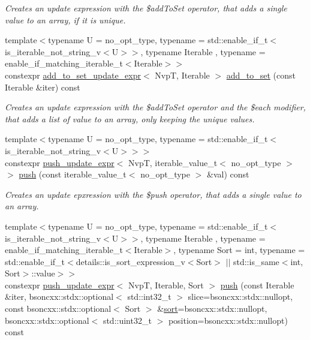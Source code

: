 \begin{DoxyCompactItemize}
\begin{DoxyCompactList}\small\item\em Creates an update expression with the \$add\+To\+Set operator, that adds a single value to an array, if it is unique. \end{DoxyCompactList}\item 
{\footnotesize template$<$typename U  = no\+\_\+opt\+\_\+type, typename  = std\+::enable\+\_\+if\+\_\+t$<$is\+\_\+iterable\+\_\+not\+\_\+string\+\_\+v$<$\+U$>$$>$, typename Iterable , typename  = enable\+\_\+if\+\_\+matching\+\_\+iterable\+\_\+t$<$\+Iterable$>$$>$ }\\constexpr \hyperlink{classmangrove_1_1add__to__set__update__expr}{add\+\_\+to\+\_\+set\+\_\+update\+\_\+expr}$<$ NvpT, Iterable $>$ \hyperlink{classmangrove_1_1nvp__base_ad38a93b45375bb4f5a2a13f2d33672e3}{add\+\_\+to\+\_\+set} (const Iterable \&iter) const 
\begin{DoxyCompactList}\small\item\em Creates an update expression with the \$add\+To\+Set operator and the \$each modifier, that adds a list of value to an array, only keeping the unique values. \end{DoxyCompactList}\item 
{\footnotesize template$<$typename U  = no\+\_\+opt\+\_\+type, typename  = std\+::enable\+\_\+if\+\_\+t$<$is\+\_\+iterable\+\_\+not\+\_\+string\+\_\+v$<$\+U$>$$>$$>$ }\\constexpr \hyperlink{classmangrove_1_1push__update__expr}{push\+\_\+update\+\_\+expr}$<$ NvpT, iterable\+\_\+value\+\_\+t$<$ no\+\_\+opt\+\_\+type $>$ $>$ \hyperlink{classmangrove_1_1nvp__base_ab4db721d19b52e5341c2ba737d2e0de9}{push} (const iterable\+\_\+value\+\_\+t$<$ no\+\_\+opt\+\_\+type $>$ \&val) const 
\begin{DoxyCompactList}\small\item\em Creates an update epxression with the \$push operator, that adds a single value to an array. \end{DoxyCompactList}\item 
{\footnotesize template$<$typename U  = no\+\_\+opt\+\_\+type, typename  = std\+::enable\+\_\+if\+\_\+t$<$is\+\_\+iterable\+\_\+not\+\_\+string\+\_\+v$<$\+U$>$$>$, typename Iterable , typename  = enable\+\_\+if\+\_\+matching\+\_\+iterable\+\_\+t$<$\+Iterable$>$, typename Sort  = int, typename  = std\+::enable\+\_\+if\+\_\+t$<$details\+::is\+\_\+sort\+\_\+expression\+\_\+v$<$\+Sort$>$ $\vert$$\vert$                                          std\+::is\+\_\+same$<$int, Sort$>$\+::value$>$$>$ }\\constexpr \hyperlink{classmangrove_1_1push__update__expr}{push\+\_\+update\+\_\+expr}$<$ NvpT, Iterable, Sort $>$ \hyperlink{classmangrove_1_1nvp__base_aa65d320fdbb15d4cf925965fa48deba5}{push} (const Iterable \&iter, bsoncxx\+::stdx\+::optional$<$ std\+::int32\+\_\+t $>$ slice=bsoncxx\+::stdx\+::nullopt, const bsoncxx\+::stdx\+::optional$<$ Sort $>$ \&\hyperlink{classmangrove_1_1nvp__base_a60b8725524a2fde6f8c9540c8445adb1}{sort}=bsoncxx\+::stdx\+::nullopt, bsoncxx\+::stdx\+::optional$<$ std\+::uint32\+\_\+t $>$ position=bsoncxx\+::stdx\+::nullopt) const 

\end{DoxyCompactItemize}
